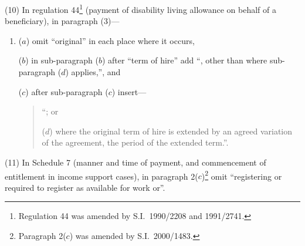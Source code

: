 \documentclass[12pt,a4paper]{article}
\begin{document}
(10) In regulation 44\footnote{Regulation 44 was amended by S.I.\ 1990/2208 and 1991/2741.} (payment of disability living allowance on behalf of a beneficiary), in paragraph (3)—
\begin{enumerate}\item[]
($a$) omit “original” in each place where it occurs,

($b$) in sub-paragraph ($b$)  after “term of hire” add “, other than where sub-paragraph ($d$)  applies,”, and

($c$) after sub-paragraph ($c$)  insert—
\begin{quotation}
“; or

($d$) where the original term of hire is extended by an agreed variation of the agreement, the period of the extended term.”.
\end{quotation}
\end{enumerate}

(11) In Schedule 7 (manner and time of payment, and commencement of entitlement in income support cases), in paragraph 2($c$)\footnote{Paragraph 2($c$) was amended by S.I.\ 2000/1483.} omit “registering or required to register as available for work or”.

\end{document}
